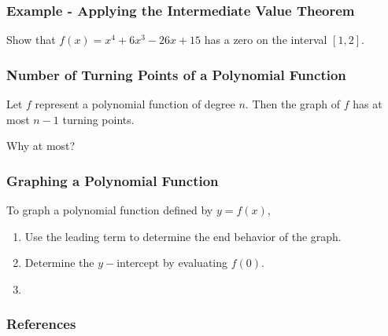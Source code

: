 \documentclass{beamer}
\begin{document}
\begin{frame}
    \frametitle{Example - Applying the Intermediate Value Theorem}

    Show that \(f(x)= x^4 + 6x^3 - 26 x + 15\) has a zero on the interval \([1,2]\). 

\end{frame}

\begin{frame}
    \frametitle{Number of Turning Points of a Polynomial Function}

    Let \(f\) represent a polynomial function of degree \(n\). Then the graph of \(f\) has at most \(n-1\) turning points. \\\pause 

    \vspace{1cm}

    Why at most? 

    

\end{frame}

\begin{frame}
    \frametitle{Graphing a Polynomial Function}

    To graph a polynomial function defined by \(y = f(x)\),
    \begin{enumerate}
        \item Use the leading term to determine the end behavior of the graph.
        \item Determine the \(y-\)intercept by evaluating \(f(0)\).
        \item 
    \end{enumerate}

\end{frame}

\begin{frame}
    \frametitle{References}
\end{frame}
\end{document}
